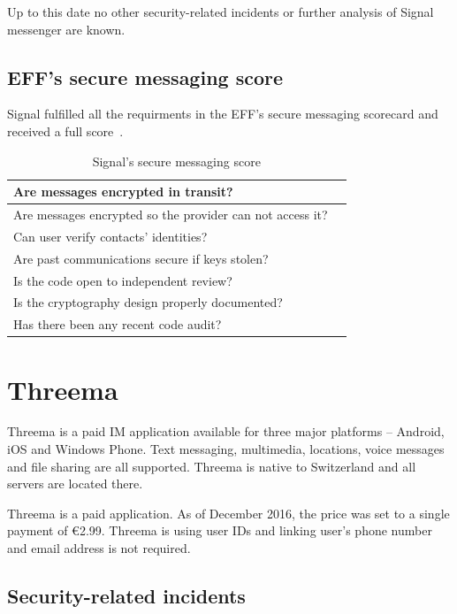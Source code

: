 \documentclass[thesis=M,english]{FITthesis}[2012/10/20]
\newcommand{\cmark}{\ding{51}}%
\begin{document}
Up to this date no other security-related incidents or further analysis of Signal messenger are known.

\subsection{EFF's secure messaging score}

Signal fulfilled all the requirments in the EFF's secure messaging scorecard and received a full score~\cite{eff-score}.

\begin{table}[htb]
	\centering
	\caption{Signal's secure messaging score}
	\label{my-label}
	\begin{tabular}{|l|l|}
		\hline
		Are messages encrypted in transit? & \cmark \\\hline
		Are messages encrypted so the provider can not access it? & \cmark \\ \hline
		Can user verify contacts' identities? & \cmark \\ \hline
		Are past communications secure if keys stolen? & \cmark \\ \hline
		Is the code open to independent review? & \cmark \\ \hline
		Is the cryptography design properly documented? & \cmark \\ \hline
		Has there been any recent code audit? & \cmark \\ \hline
	\end{tabular}
\end{table}


\section{Threema}

Threema is a paid IM application available for three major platforms -- Android, iOS and Windows Phone. Text messaging, multimedia, locations, voice messages and file sharing are all supported. Threema is native to Switzerland and all servers are located there.

Threema is a paid application. As of December 2016, the price was set to a single payment of \euro2.99. Threema is using user IDs and linking user's phone number and email address is not required.

\subsection{Security-related incidents}
\end{document}
